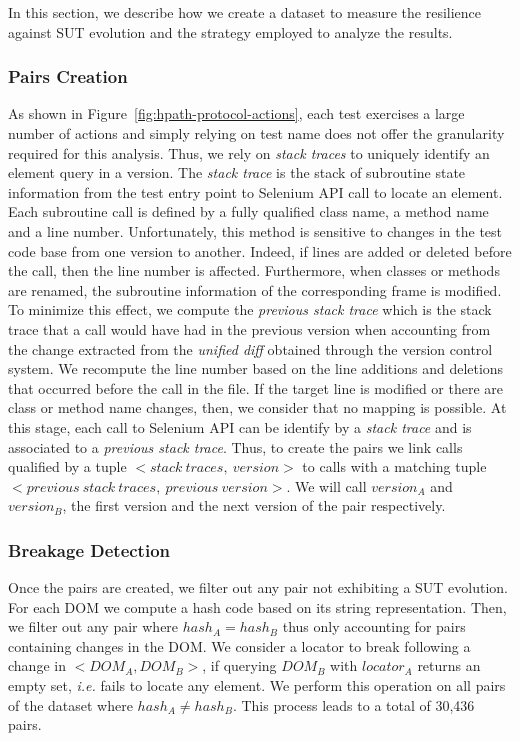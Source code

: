 In this section, we describe how we create a dataset to measure the resilience against SUT evolution and the strategy employed to analyze the results.

\subsubsection{Pairs Creation}
\label{sec:hpath-protocol-pairs}

As shown in Figure~\ref{fig:hpath-protocol-actions}, each test exercises a large number of actions and simply relying on test name does not offer the granularity required for this analysis. Thus, we rely on \emph{stack traces} to uniquely identify an element query in a version. The \emph{stack trace} is the stack of subroutine state information from the test entry point to Selenium API call to locate an element. Each subroutine call is defined by a fully qualified class name, a method name and a line number. Unfortunately, this method is sensitive to changes in the test code base from one version to another. Indeed, if lines are added or deleted before the call, then the line number is affected. Furthermore, when classes or methods are renamed, the subroutine information of the corresponding frame is modified. To minimize this effect, we compute the \emph{previous stack trace} which is the stack trace that a call would have had in the previous version when accounting from the change extracted from the \emph{unified diff} obtained through the version control system. We recompute the line number based on the line additions and deletions that occurred before the call in the file. If the target line is modified or there are class or method name changes, then, we consider that no mapping is possible. At this stage, each call to Selenium API can be identify by a \emph{stack trace} and is associated to a \emph{previous stack trace}. Thus, to create the pairs we link calls qualified by a tuple $<stack\:traces,\:version>$ to calls with a matching tuple $<previous\:stack\:traces,\:previous\:version>$. We will call $version_A$ and $version_B$, the first version and the next version of the pair respectively.

\subsubsection{Breakage Detection}
\label{sec:hpath-protocol-breakage-detection}

Once the pairs are created, we filter out any pair not exhibiting a SUT evolution. For each DOM we compute a hash code based on its string representation. Then, we filter out any pair where $hash_A = hash_B$ thus only accounting for pairs containing changes in the DOM. We consider a locator to break following a change in $<DOM_A, DOM_B>$, if querying $DOM_B$ with $locator_A$ returns an empty set, \emph{i.e.} fails to locate any element. We perform this operation on all pairs of the dataset where $hash_A \neq hash_B$. This process leads to a total of 30,436 pairs.

